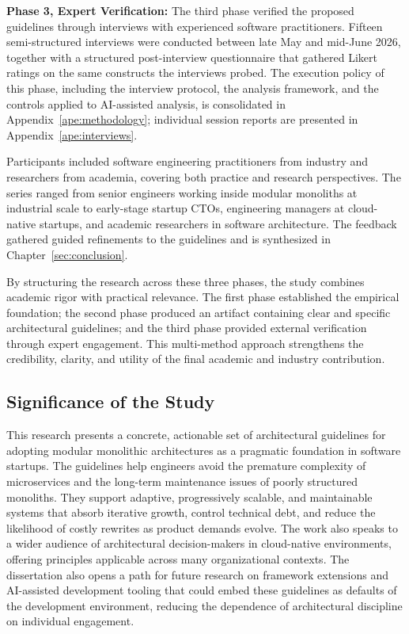 \textbf{Phase 3, Expert Verification:}
The third phase verified the proposed guidelines through interviews with experienced software practitioners. Fifteen semi-structured interviews were conducted between late May and mid-June 2026, together with a structured post-interview questionnaire that gathered Likert ratings on the same constructs the interviews probed. The execution policy of this phase, including the interview protocol, the analysis framework, and the controls applied to AI-assisted analysis, is consolidated in Appendix~\ref{ape:methodology}; individual session reports are presented in Appendix~\ref{ape:interviews}.

Participants included software engineering practitioners from industry and researchers from academia, covering both practice and research perspectives. The series ranged from senior engineers working inside modular monoliths at industrial scale to early-stage startup CTOs, engineering managers at cloud-native startups, and academic researchers in software architecture. The feedback gathered guided refinements to the guidelines and is synthesized in Chapter~\ref{sec:conclusion}.

\medskip

By structuring the research across these three phases, the study combines academic rigor with practical relevance. The first phase established the empirical foundation; the second phase produced an artifact containing clear and specific architectural guidelines; and the third phase provided external verification through expert engagement. This multi-method approach strengthens the credibility, clarity, and utility of the final academic and industry contribution.

\subsection*{Significance of the Study}

This research presents a concrete, actionable set of architectural guidelines for adopting modular monolithic architectures as a pragmatic foundation in software startups. The guidelines help engineers avoid the premature complexity of microservices and the long-term maintenance issues of poorly structured monoliths. They support adaptive, progressively scalable, and maintainable systems that absorb iterative growth, control technical debt, and reduce the likelihood of costly rewrites as product demands evolve. The work also speaks to a wider audience of architectural decision-makers in cloud-native environments, offering principles applicable across many organizational contexts. The dissertation also opens a path for future research on framework extensions and AI-assisted development tooling that could embed these guidelines as defaults of the development environment, reducing the dependence of architectural discipline on individual engagement.


